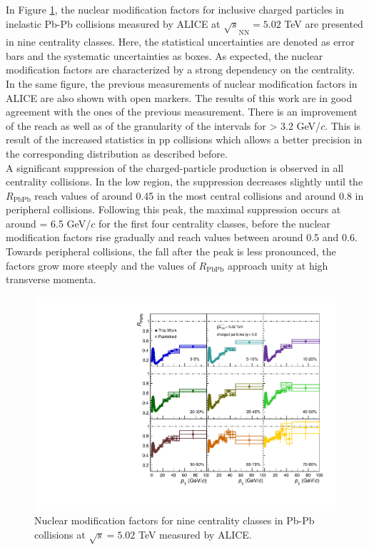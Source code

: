 \documentclass[12pt,a4paper]{report}
\begin{document}
In Figure \ref{Raa}, the nuclear modification factors for inclusive charged particles in inelastic Pb-Pb collisions measured by ALICE at $\sqrt{s}_\text{NN}=5.02$ TeV are presented in nine centrality classes. Here, the statistical uncertainties are denoted as error bars and the systematic uncertainties as boxes. As expected, the nuclear modification factors are characterized by a strong dependency on the centrality. In the same figure, the previous measurements of nuclear modification factors in ALICE are also shown with open markers. The results of this work are in good agreement with the ones of the previous measurement. There is an improvement of the \pt reach as well as of the granularity of the intervals for \pt > 3.2 GeV/$c$. This is result of the increased statistics in pp collisions which allows a better precision in the corresponding \pt distribution as described before.\\
A significant suppression of the charged-particle production is observed in all centrality collisions. In the low \pt region, the suppression decreases slightly until the $R_\text{PbPb}$ reach values of around 0.45 in the most central collisions and around 0.8 in peripheral collisions. Following this peak, the maximal suppression occurs at around \pt = 6.5 GeV/$c$ for the first four centrality classes, before the nuclear modification factors rise gradually and reach values between around 0.5 and 0.6. Towards peripheral collisions, the fall after the peak is less pronounced, the factors grow more steeply and the values of $R_\text{PbPb}$ approach unity at high transverse momenta. 
\begin{figure}[tb!]
\centering
\includegraphics[width=12cm]{Plots/Raa.pdf}  
\caption{Nuclear modification factors for nine centrality classes in Pb-Pb collisions at $\sqrt{s}=5.02$ TeV measured by ALICE.}
\label{Raa}
\end{figure}
\end{document}
